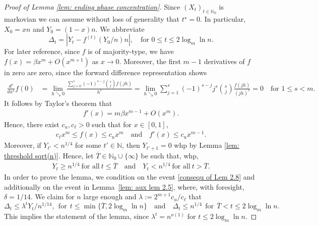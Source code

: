 \documentclass[10pt,a4paper]{amsart}
\begin{document}
\begin{proof}[Proof of Lemma \ref{lem: ending phase concentration}]
Since $(X_t)_{t\in \mathbb{N}_0}$ is markovian we can assume without loss of generality that $t^\star = 0$. In particular, $X_0 = xn$ and $Y_0 = (1-x)n$.
We abbreviate
\[
    \Delta_{t} = \left|Y_{t} - f^{(t)}(Y_0/n)n \right|,
    \quad\text{for } 0 \le t \le 2 \log_m\ln n.
\]
For later reference, since $f$ is of majority-type, we have $f(x)=\beta x^m + O(x^{m+1})$ as $x\to 0$. Moreover, the first $m-1$ derivatives of $f$ in zero are zero, since the forward difference representation shows
\begin{align*}
    \frac{d^s}{dx^s} f (0) &= \lim_{h\searrow 0} \frac{\sum_{j=0}^{s} (-1)^{s-j}\binom{s}{j}f(jh)}{h^s} = \lim_{h\searrow 0} \sum_{j=1}^{s} (-1)^{s-j} j^s \binom{s}{j} \frac{f(jh)}{(jh)^s} = 0 
    \quad\text{for }
    1\leq s <m.
\end{align*}
It follows by Taylor's theorem that
\begin{align}\label{equ: formula derivative}
    f'(x)=m\beta x^{m-1} + O(x^{m}).
\end{align}
Hence, there exist $c_u,c_\ell>0$ such that for $x\in[0,1]$,
\begin{align}\label{inequ: f upper lower x^m}
    c_\ell x^m \leq f(x) \leq c_ux^m
    \quad\text{and}\quad
    f'(x)\leq c_ux^{m-1}.
\end{align}
Moreover, if $Y_{t'} < n^{1/4}$ for some $t' \in \mathbb{N}$, then $Y_{t'+1} =0$ whp by Lemma \ref{lem: threshold sqrt(n)}. Hence, let $\overline{T} \in \mathbb{N}_0 \cup \{\infty\}$ be such that, whp,
\begin{align}\label{consequ of Lem 2.8}
    Y_{t} \geq n^{1/4} ~ \text{for all} ~  t\leq \overline{T}
    \quad \text{and} \quad
    Y_{t} < n^{1/4} ~ \text{for all} ~  t > \overline{T}.
\end{align}
In order to prove the lemma, we condition
on the event \eqref{consequ of Lem 2.8} and additionally
on the event in Lemma~\ref{lem: aux lem 2.5}, where, with foresight, $\delta=1/14$. We claim for $n$ large enough and $\lambda:=2^{m+1}c_u/c_\ell$ that
\begin{equation}
\label{eq:boundD_t}
    \Delta_t \leq \lambda^tY_t/n^{1/14},
    ~~\text{for}~~
    t\leq \min\{\overline{T}, 2\log_m\ln n\}
    \quad\text{and}\quad
    \Delta_{t} \leq n^{1/4}
    ~~\text{for}~~
    \overline{T} < t \le 2\log_m\ln n .
\end{equation}
This implies the statement of the lemma, since $\lambda^t = n^{o(1)}$ for $t \leq 2 \log_m \ln n$.

\end{proof}
\end{document}
